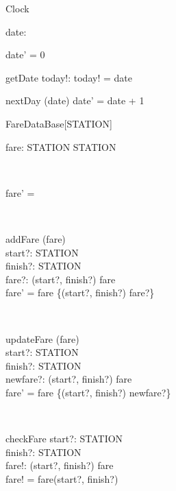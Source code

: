 \zedsize{\small}
\begin{class}{Clock}
\also
\begin{state}
date:  \nat
\end{state}
\begin{init}
date' = 0\end{init}
\begin{schema}{getDate}
today!:  \nat  
\where
today! = date
\end{schema}
\begin{schema}{nextDay}
\Delta (date)
\where
date' = date + 1
\end{schema} 
\end{class} 

\begin{class}{FareDataBase}[STATION]
\also
\begin{state}
fare: STATION \cross STATION \pfun  \nat  
\end{state} \\ 
\begin{init}
fare' = \emptyset\end{init} \\ 
\begin{schema}{addFare}
\Delta (fare)\\
start?: STATION \\ 
finish?: STATION \\ 
fare?:  \nat  
\where
(start?, finish?) \notin  \dom fare \\ 
fare' = fare \cup \{(start?, finish?) \mapsto fare?\} \\ 
\end{schema} \\ 
\begin{schema}{updateFare}
\Delta (fare)\\
start?: STATION \\ 
finish?: STATION \\ 
newfare?:  \nat  
\where
 (start?, finish?) \in  \dom fare \\ 
fare' = fare \oplus \{(start?, finish?) \mapsto newfare?\} \\ 
\end{schema} \\ 
\begin{schema}{checkFare}
start?: STATION \\ 
finish?: STATION \\ 
fare!:  \nat  
\where
 (start?, finish?) \in  \dom fare \\ 
fare! = fare(start?, finish?)
\end{schema} 
\end{class} 


